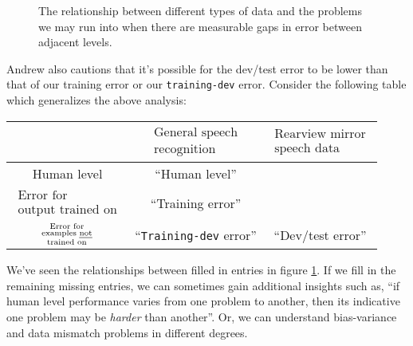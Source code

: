 \documentclass[12pt]{article}
\begin{document}
\begin{figure}[h]
\centering
\label{fig: relationshipsbwdifferrs}
\caption{The relationship between different types of data and the problems we may run into when there are measurable gaps in error between adjacent levels.}
\end{figure}

Andrew also cautions that it's possible for the dev/test error to be lower than that of our training error or our \texttt{training-dev} error. Consider the following table which generalizes the above analysis:
\begin{table}[h]
\centering
\begin{tabular}{c| c c }
 & $\substack{\textrm{General speech} \\ \textrm{recognition}}$ & $\substack{\textrm{Rearview mirror} \\ \textrm{speech data}}$ \\
\hline
Human level & ``Human level'' & \\
$\substack{\textrm{Error for} \\ \textrm{output trained on}}$ & ``Training error'' & \\
$\substack{\textrm{Error for} \\ \textrm{examples \uline{not}} \\ \textrm{trained on}}$ & ``\texttt{Training-dev} error'' & ``Dev/test error''\\ \end{tabular}
\end{table}

We've seen the relationships between filled in entries in figure \ref{fig: relationshipsbwdifferrs}. If we fill in the remaining missing entries, we can sometimes gain additional insights such as, ``if human level performance varies from one problem to another, then its indicative one problem may be \emph{harder} than another''. Or, we can understand bias-variance and data mismatch problems in different degrees.
\end{document}

